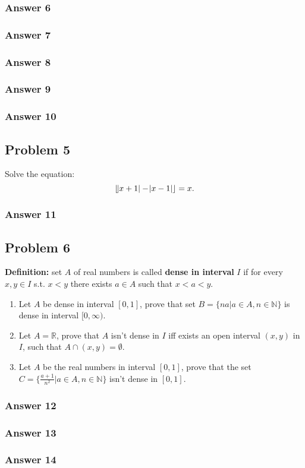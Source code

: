 \documentclass[11pt]{article}
\begin{document}
\subsubsection{Answer 6}
\label{sec-1-4-1}
\subsubsection{Answer 7}
\label{sec-1-4-2}
\subsubsection{Answer 8}
\label{sec-1-4-3}
\subsubsection{Answer 9}
\label{sec-1-4-4}
\subsubsection{Answer 10}
\label{sec-1-4-5}
\subsection{Problem 5}
\label{sec-1-5}
Solve the equation:
\begin{equation*}
   \lfloor \abs{x+1}-\abs{x-1} \rfloor = x.
\end{equation*}


\subsubsection{Answer 11}
\label{sec-1-5-1}
\subsection{Problem 6}
\label{sec-1-6}
\textbf{Definition:} set $A$ of real numbers is called \textbf{dense in interval} $I$ if
for every $x, y \in I$ s.t. $x < y$ there exists $a \in A$ such that
$x < a < y$.

\begin{enumerate}
\item Let $A$ be dense in interval $[0,1]$, prove that set 
      $B=\{na|a \in A, n \in \mathbb{N}\}$ is dense in interval $[0, \infty)$.
\item Let $A=\mathbb{R}$, prove that $A$ isn't dense in $I$ iff exists an
open interval $(x, y)$ in $I$, such that $A \cap (x, y) = \emptyset$.
\item Let $A$ be the real numbers in interval $[0,1]$, prove that the set
      $C=\{\frac{a+1}{n^2} | a \in A, n \in \mathbb{N}\}$ isn't dense in
      $[0,1]$.
\end{enumerate}

\subsubsection{Answer 12}
\label{sec-1-6-1}
\subsubsection{Answer 13}
\label{sec-1-6-2}
\subsubsection{Answer 14}
\label{sec-1-6-3}
\end{document}
